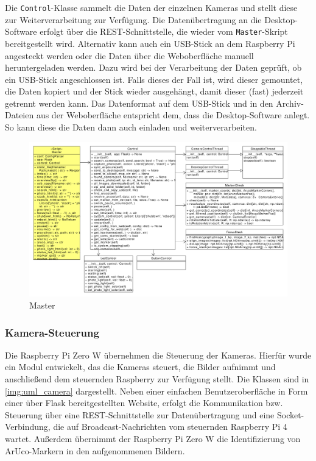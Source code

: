 \documentclass[./00PhotoBox.tex]{subfiles}
\begin{document}
Die \texttt{Control}-Klasse sammelt die Daten der einzelnen Kameras und stellt diese zur Weiterverarbeitung zur Verfügung. Die Datenübertragung an die Desktop-Software erfolgt über die REST-Schnittstelle, die wieder vom \texttt{Master}-Skript bereitgestellt wird. Alternativ kann auch ein USB-Stick an dem Raspberry Pi angesteckt werden oder die Daten über die Weboberfläche manuell heruntergeladen werden. Dazu wird bei der Verarbeitung der Daten geprüft, ob ein USB-Stick angeschlossen ist. Falls dieses der Fall ist, wird dieser gemountet, die Daten kopiert und der Stick wieder ausgehängt, damit dieser (fast) jederzeit getrennt werden kann. Das Datenformat auf dem USB-Stick und in den Archiv-Dateien aus der Weboberfläche entspricht dem, dass die Desktop-Software anlegt. So kann diese die Daten dann auch einladen und weiterverarbeiten.

\begin{figure}
  \centering
  \includegraphics[width=1\textwidth]{./img/uml/uml_master_classdiagramm.pdf}
  \caption{Master} %
  \label{img:master} %
\end{figure}


\subsubsection{Kamera-Steuerung}
Die Raspberry Pi Zero W übernehmen die Steuerung der Kameras. Hierfür wurde ein Modul entwickelt, das die Kameras steuert, die Bilder aufnimmt und anschließend dem steuernden Raspberry zur Verfügung stellt. Die Klassen sind in \autoref{img:uml_camera} dargestellt. Neben einer einfachen Benutzeroberfläche in Form einer über Flask bereitgestellten Website, erfolgt die Kommunikation bzw. Steuerung über eine REST-Schnittstelle zur Datenübertragung und eine Socket-Verbindung, die auf Broadcast-Nachrichten vom steuernden Raspberry Pi 4 wartet. Außerdem übernimmt der Raspberry Pi Zero W die Identifizierung von ArUco-Markern in den aufgenommenen Bildern.
\end{document}
